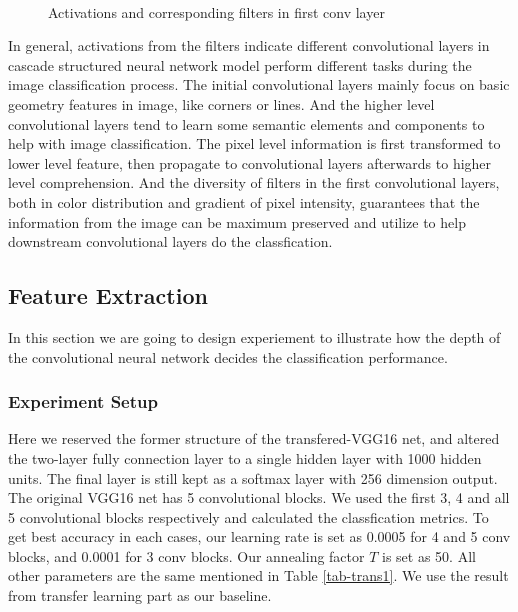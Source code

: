 \begin{figure}[H]
\centering
{}%
%
%
\\%

%
%
%
%
\caption{Activations and corresponding filters in first conv layer}
\label{fig-filter-in}
\end{figure}

In general, activations from the filters indicate different convolutional layers in cascade  structured neural network model perform different tasks during the image classification process. The initial convolutional layers mainly focus on basic geometry features in image, like corners or lines. And the higher level convolutional layers tend to learn some semantic elements and components to help with image classification. The pixel level information is first transformed to lower level feature, then propagate to convolutional layers afterwards to higher level comprehension. And the diversity of filters in the first convolutional layers, both in color distribution and gradient of pixel intensity, guarantees that the information from the image can be maximum preserved and utilize to help downstream convolutional layers do the classfication.

\subsection{Feature Extraction}
In this section we are going to design experiement to illustrate how the depth of the convolutional neural network decides the classification performance. 

\subsubsection{Experiment Setup}
Here we reserved the former structure of the transfered-VGG16 net, and altered the two-layer fully connection layer to a single hidden layer with 1000 hidden units. The final layer is still kept as a softmax layer with 256 dimension output. The original VGG16 net has 5 convolutional blocks. We used the first 3, 4 and all 5 convolutional blocks respectively and calculated the classfication metrics. To get best accuracy in each cases, our learning rate is set as 0.0005 for 4 and 5 conv blocks, and 0.0001 for 3 conv blocks. Our annealing factor $T$ is set as 50. All other parameters are the same mentioned in Table \ref{tab-trans1}. We use the result from transfer learning part as our baseline.

